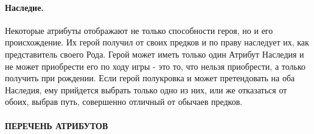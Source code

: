 \paragraph{Наследие.} Некоторые атрибуты отображают не только способности героя, но и его происхождение. Их герой получил от своих предков и по праву наследует их, как представитель своего Рода. Герой может иметь только один Атрибут Наследия и не может приобрести его по ходу игры - это то, что нельзя приобрести, а только получить при рождении. Если герой полукровка и может претендовать на оба Наследия, ему прийдется выбрать только одно из них, или же отказаться от обоих, выбрав путь, совершенно отличный от обычаев предков.

\paragraph{ПЕРЕЧЕНЬ АТРИБУТОВ}
